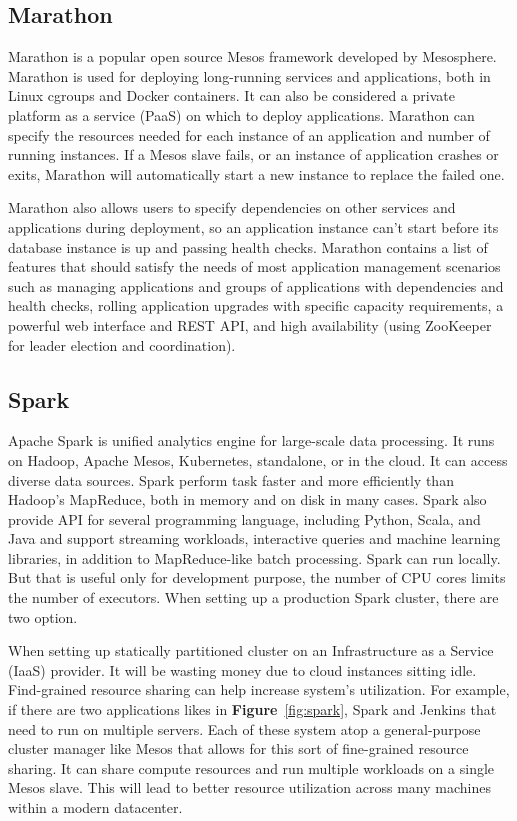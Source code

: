 \documentclass[12pt,oneside,openright,a4paper]{cpe-english-project}
\begin{document}
\subsection{Marathon}
\hspace{10mm}Marathon is a popular open source Mesos framework developed by Mesosphere. Marathon is used for deploying long-running services and applications, both in Linux cgroups and Docker containers. It can also be considered a private platform as a service (PaaS) on which to deploy applications. Marathon can specify the resources needed for each instance of an application and number of running instances. If a Mesos slave fails, or an instance of application crashes or exits, Marathon will automatically start a new instance to replace the failed one.

\hspace{10mm}Marathon also allows users to specify dependencies on other services and applications during deployment, so an application instance can’t start before its database instance is up and passing health checks. Marathon contains a list of features that should satisfy the needs of most application management scenarios such as managing applications and groups of applications with dependencies and health checks, rolling application upgrades with specific capacity requirements, a powerful web interface and REST API, and high availability (using ZooKeeper for leader election and coordination).\cite{mesosInAction}

\subsection{Spark}
\hspace{10mm}Apache Spark is unified analytics engine for large-scale data processing. It runs on Hadoop, Apache Mesos, Kubernetes, standalone, or in the cloud. It can access diverse data sources. Spark perform task faster and more efficiently than Hadoop’s MapReduce, both in memory and on disk in many cases. Spark also provide API for several programming language, including Python, Scala, and Java and support streaming workloads, interactive queries and machine learning libraries, in addition to MapReduce-like batch processing.  Spark can run locally. But that is useful only for development purpose, the number of CPU cores limits the number of executors. When setting up a production Spark cluster, there are two option.

\hspace{10mm}When setting up statically partitioned cluster on an Infrastructure as a Service (IaaS) provider. It will be wasting money due to cloud instances sitting idle. Find-grained resource sharing can help increase system’s utilization. For example, if there are two applications likes in \textbf{Figure}~\ref{fig:spark}, Spark and Jenkins that need to run on multiple servers. Each of these system atop a general-purpose cluster manager like Mesos that allows for this sort of fine-grained resource sharing. It can share compute resources and run multiple workloads on a single Mesos slave. This will lead to better resource utilization across many machines within a modern datacenter.\cite{mesosInAction}
\end{document}
